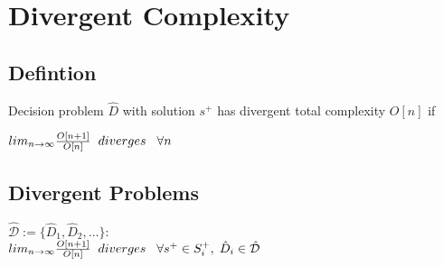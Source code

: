 \documentclass[11pt]{article}
\begin{document}
\section{Divergent Complexity}
\subsection{Defintion}
Decision problem $\hat{D}$ with solution $s^+$ has divergent total complexity $O[n]$ if
\begin{center}
$
lim_{n \rightarrow \infty} \frac{O[n+1]}{O[n]} \hspace{2mm} diverges \hspace{3mm} \forall n
$
\end{center}




\subsection{Divergent Problems}
\begin{center}
$
\mathcal{\hat{D}} := \{ \hat{D}_1,\hat{D}_2,...\} :
$
\\ \vspace{2mm}
$
lim_{n \rightarrow \infty} \frac{O[n+1]}{O[n]} \hspace{2mm} diverges \hspace{3mm} \forall s^+ \in S^+_i, \hspace{1mm} \hat{D}_i \in \mathcal{\hat{D}}
$
\end{center}










\end{document}
